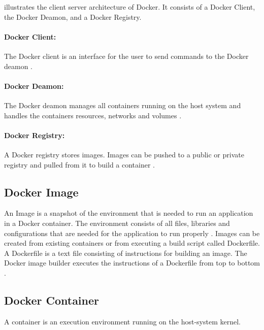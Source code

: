  illustrates the client server architecture of Docker. It consists of a Docker Client, the Docker Deamon, and a Docker Registry.


\paragraph{Docker Client:} The Docker client is an interface for the user to send commands to the Docker deamon \cite{Docker2020Docs}.


\paragraph{Docker Deamon:} The Docker deamon manages all containers running on the host system and handles the containers resources, networks and volumes \cite{Bullington2020Docker}.


\paragraph{Docker Registry:} A Docker registry stores images. Images can be pushed to a public or private registry and pulled from it to build a container \cite{Docker2020Docs}.


\subsection{Docker Image}
\label{subsec:04_docker_image}
An Image is a snapshot of the environment that is needed to run an application in a Docker container. The environment consists of all files, libraries and configurations that are needed for the application to run properly \cite{Docker2020Docs, Nickoloff2019Docker}.
Images can be created from existing containers or from executing a build script called Dockerfile. A Dockerfile is a text file consisting of instructions for building an image. The Docker image builder executes the instructions of a Dockerfile from top to bottom \cite{Nickoloff2019Docker}.


\subsection{Docker Container}
A container is an execution environment running on the host-system kernel.

